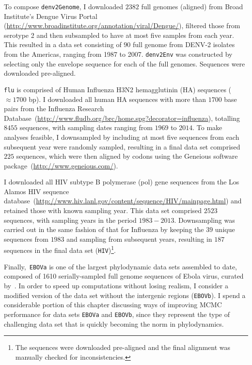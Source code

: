 To compose \verb|denv2Genome|, I downloaded  $2382$ full genomes (aligned) from Broad Institute's Dengue Virus Portal (\url{http://www.broadinstitute.org/annotation/viral/Dengue/}), filtered those from serotype 2 and then subsampled to have at most five samples from each year.
This resulted in a data set consisting of $90$ full genome from DENV-2 isolates from the Americas, ranging from 1987 to 2007.
\verb|denv2Env| was constructed by selecting only the envelope sequence for each of the full genomes.
Sequences were downloaded pre-aligned.

\verb|flu| is comprised of Human Influenza H3N2 hemagglutinin (HA) sequences ($\approx 1700$ bp).
I downloaded all human HA sequences with more than $1700$ base pairs from the Influenza Research Database~(\url{http://www.fludb.org/brc/home.spg?decorator=influenza}), totalling $8455$ sequences, with sampling dates ranging from $1969$ to $2014$. 
To make analyses feasible, I downsampled by including at most five sequences from each subsequent year were randomly sampled, resulting in a final data set comprised $225$ sequences, which were then aligned by codons using the Geneious software package~(\url{http://www.geneious.com/}).

I downloaded all HIV subtype B polymerase (pol) gene sequences from the Los Alamos HIV sequence database~(\url{http://www.hiv.lanl.gov/content/sequence/HIV/mainpage.html}) and retained those with known sampling year.
This data set comprised $2523$ sequences, with sampling years in the period $1983-2013$.
Downsampling was carried out in the same fashion of that for Influenza by keeping the $39$ unique sequences from $1983$ and sampling from subsequent years, resulting in $187$ sequences in the final data set (\verb|HIV|)\footnote{The sequences were downloaded pre-aligned and the final alignment was manually checked for inconsistencies.}.

Finally,~\verb|EBOVa| is one of the largest phylodynamic data sets assembled to date, composed of 1610 serially-sampled full genome sequences of Ebola virus, curated by~\cite{Dudas2017}.
In order to speed up computations without losing realism, I consider a modified version of the data set without the intergenic regions (\verb|EBOVb|).
I spend a considerable portion of this chapter discussing ways of improving MCMC performance for data sets \verb|EBOVa| and \verb|EBOVb|, since they represent the type of challenging data set that is quickly becoming the norm in phylodynamics.

